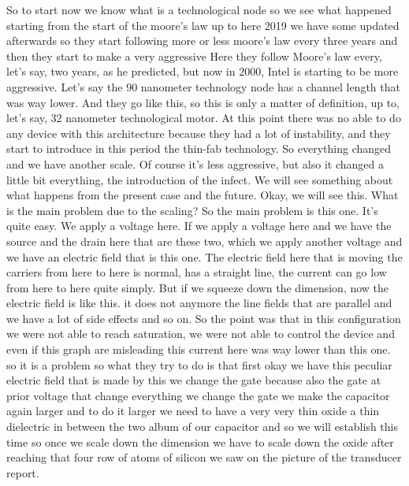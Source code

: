 So to start now we know what is a technological node so we see what happened starting from the start of the moore's law up to here 2019 we have some updated afterwards so they start following more or less moore's law every three years and then they start to make a very aggressive Here they follow Moore's law every, let's say, two years, as he predicted, but now in 2000, Intel is starting to be more aggressive. Let's say the 90 nanometer technology node has a channel length that was way lower. And they go like this, so this is only a matter of definition, up to, let's say, 32 nanometer technological motor. At this point there was no able to do any device with this architecture because they had a lot of instability, and they start to introduce in this period the thin-fab technology. So everything changed and we have another scale. Of course it's less aggressive, but also it changed a little bit everything, the introduction of the infect. We will see something about what happens from the present case and the future. Okay, we will see this.
What is the main problem due to the scaling? So the main problem is this one. It's quite easy. We apply a voltage here. If we apply a voltage here and we have the source and the drain here that are these two, which we apply another voltage and we have an electric field that is this one. The electric field here that is moving the carriers from here to here is normal, has a straight line, the current can go low from here to here quite simply. But if we squeeze down the dimension, now the electric field is like this. it does not anymore the line fields that are parallel and we have a lot of side effects and so on. So the point was that in this configuration we were not able to reach saturation, we were not able to control the device and even if this graph are misleading this current here was way lower than this one. so it is a problem so what they try to do is that first okay we have this peculiar electric field that is made by this we change the gate because also the gate at prior voltage that change everything we change the gate we make the capacitor again larger and to do it larger we need to have a very very thin oxide a thin dielectric in between the two album of our capacitor and so we will establish this time so once we scale down the dimension we have to scale down the oxide after reaching that four row of atoms of silicon we saw on the picture of the transducer report.
